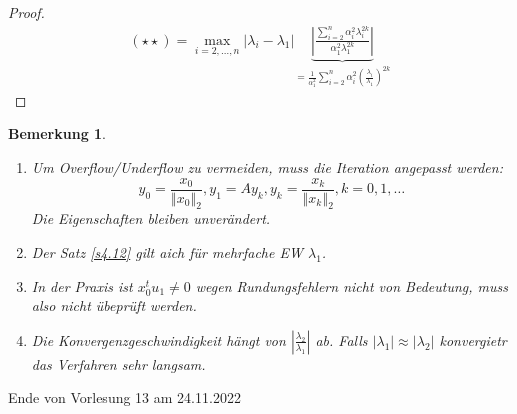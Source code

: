 \documentclass{book}
\newtheorem{remark}[algorithm]{Bemerkung}
\begin{document}
\begin{proof}
                \begin{align*}
                    (\star\star) = \max_{i=2,\dots,n}\left\vert \lambda_i-\lambda_1 \right\vert \underbrace{\left\vert \frac{\sum_{i=2}^n\alpha_i^2\lambda_i^{2k}}{\alpha_1^2\lambda_1^{2k}} \right\vert}_{=\frac{1}{\alpha_1^2}\sum_{i=2}^n \alpha_i^2 \left(\frac{\lambda_i}{\lambda_1}\right)^{2k}} %
                \end{align*}

            \end{proof}

            \begin{remark}\label{4.13}
                \begin{enumerate}
                    \item Um Overflow/Underflow zu vermeiden, muss die Iteration angepasst werden:
                        \[y_0=\frac{x_0}{\left\Vert x_0 \right\Vert_2},y_1=Ay_k,y_k=\frac{x_k}{\left\Vert x_k \right\Vert_2}, k=0,1,\dots \]
                        Die Eigenschaften bleiben unverändert.
                    \item Der Satz \ref{s4.12} gilt aich für mehrfache EW $\lambda_1$.
                    \item In der Praxis ist $x_0^tu_1\neq 0$ wegen Rundungsfehlern nicht von Bedeutung, muss also nicht übeprüft werden.
                    \item Die Konvergenzgeschwindigkeit hängt von $\left\vert \frac{\lambda_2}{\lambda_1} \right\vert$ ab. Falls $ \vert \lambda_1 \vert \approx \vert \lambda_2 \vert $ konvergietr das Verfahren sehr langsam.    
                \end{enumerate}
            \end{remark}



            \noindent
            \xrfill[0.7ex]{1pt}Ende von Vorlesung 13 am 24.11.2022\xrfill[0.7ex]{1pt}
            
\end{document}
